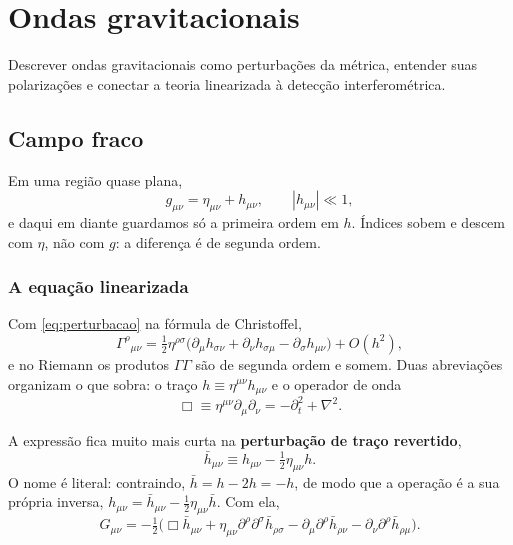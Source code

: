 \documentclass[12pt,a4paper,oneside]{book}
\theoremstyle{rgplain}
\theoremstyle{rgremark}
\begin{document}
\chapter{Ondas gravitacionais}
\label{cap:ondas}

\begin{objetivos}
Descrever ondas gravitacionais como perturbações da métrica, entender suas
polarizações e conectar a teoria linearizada à detecção interferométrica.
\end{objetivos}

\section{Campo fraco}
\label{sec:linearizacao}

Em uma região quase plana,
\begin{equation}
  g_{\mu\nu}=\eta_{\mu\nu}+h_{\mu\nu},
  \qquad |h_{\mu\nu}|\ll1 ,
  \label{eq:perturbacao}
\end{equation}
e daqui em diante guardamos só a primeira ordem em $h$. Índices sobem e
descem com $\eta$, não com $g$: a diferença é de segunda ordem.

\subsection*{A equação linearizada}

Com \eqref{eq:perturbacao} na fórmula de Christoffel,
\[
  \Gamma^\rho{}_{\mu\nu}
  =\tfrac12\eta^{\rho\sigma}\bigl(\partial_\mu h_{\sigma\nu}
  +\partial_\nu h_{\sigma\mu}-\partial_\sigma h_{\mu\nu}\bigr)+O(h^2) ,
\]
e no Riemann os produtos $\Gamma\Gamma$ são de segunda ordem e somem. Duas
abreviações organizam o que sobra: o traço
$h\equiv\eta^{\mu\nu}h_{\mu\nu}$ e o operador de onda
\begin{equation}
  \Box\equiv\eta^{\mu\nu}\partial_\mu\partial_\nu
  =-\partial_t^2+\nabla^2 .
  \label{eq:dalembertiano}
\end{equation}

A expressão fica muito mais curta na \textbf{perturbação de traço
revertido},
\begin{equation}
  \bar h_{\mu\nu}\equiv h_{\mu\nu}-\tfrac12\eta_{\mu\nu}h .
  \label{eq:traco-revertido}
\end{equation}
O nome é literal: contraindo, $\bar h=h-2h=-h$, de modo que a operação é a sua
própria inversa, $h_{\mu\nu}=\bar h_{\mu\nu}-\tfrac12\eta_{\mu\nu}\bar h$.
Com ela,
\begin{equation}
  G_{\mu\nu}=-\tfrac12\bigl(\Box\bar h_{\mu\nu}
  +\eta_{\mu\nu}\partial^\rho\partial^\sigma\bar h_{\rho\sigma}
  -\partial_\mu\partial^\rho\bar h_{\rho\nu}
  -\partial_\nu\partial^\rho\bar h_{\rho\mu}\bigr) .
  \label{eq:einstein-linearizado}
\end{equation}
\end{document}
